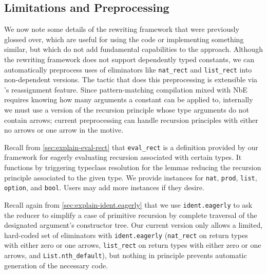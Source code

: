 \subsection{Limitations and Preprocessing} \label{sec:implementation-and-usage}


We now note some details of the rewriting framework that were previously glossed over, which are useful for using the code or implementing something similar, but which do not add fundamental capabilities to the approach.
Although the rewriting framework does not support dependently typed constants, we can automatically preprocess uses of eliminators like \texttt{nat_rect} and \texttt{list_rect} into non-dependent versions.
The tactic that does this preprocessing is extensible via \Ltac{}'s reassignment feature.
Since pattern-matching compilation mixed with NbE requires knowing how many arguments a constant can be applied to, internally we must use a version of the recursion principle whose type arguments do not contain arrows; current preprocessing can handle recursion principles with either no arrows or one arrow in the motive.

Recall from \autoref{sec:explain-eval-rect} that \texttt{eval_rect} is a definition provided by our framework for eagerly evaluating recursion associated with certain types.
It functions by triggering typeclass resolution for the lemmas reducing the recursion principle associated to the given type.
We provide instances for \texttt{nat}, \texttt{prod}, \texttt{list}, \texttt{option}, and \texttt{bool}.
Users may add more instances if they desire.

Recall again from \autoref{sec:explain-ident.eagerly} that we use \texttt{ident.eagerly} to ask the reducer to simplify a case of primitive recursion by complete traversal of the designated argument's constructor tree.
Our current version only allows a limited, hard-coded set of eliminators with \texttt{ident.eagerly} (\texttt{nat\_rect} on return types with either zero or one arrows, \texttt{list\_rect} on return types with either zero or one arrows, and \texttt{List.nth\_default}), but nothing in principle prevents automatic generation of the necessary code.

